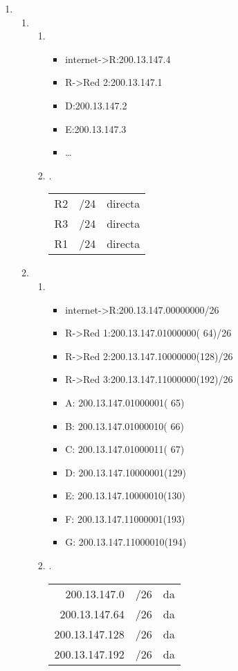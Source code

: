 \documentclass[11pt]{article}
\begin{document}
\begin{enumerate}
\begin{enumerate}
\end{enumerate}
\item \begin{enumerate}
\item \begin{enumerate}
\item \begin{itemize}
\item internet->R:200.13.147.4
\item R->Red 2:200.13.147.1
\item D:200.13.147.2
\item E:200.13.147.3
\item \ldots{}
\end{itemize}
\item .
\begin{center}
\begin{tabular}{lll}
R2 & /24 & directa\\
R3 & /24 & directa\\
R1 & /24 & directa\\
\end{tabular}
\end{center}
\end{enumerate}
\item \begin{enumerate}
\item \begin{itemize}
\item internet->R:200.13.147.00000000/26
\item R->Red 1:200.13.147.01000000( 64)/26
\item R->Red 2:200.13.147.10000000(128)/26
\item R->Red 3:200.13.147.11000000(192)/26
\item A: 200.13.147.01000001( 65)
\item B: 200.13.147.01000010( 66)
\item C: 200.13.147.01000011( 67)
\item D: 200.13.147.10000001(129)
\item E: 200.13.147.10000010(130)
\item F: 200.13.147.11000001(193)
\item G: 200.13.147.11000010(194)
\end{itemize}
\item .
\begin{center}
\begin{tabular}{rll}
200.13.147.0 & /26 & da\\
200.13.147.64 & /26 & da\\
200.13.147.128 & /26 & da\\
200.13.147.192 & /26 & da\\
\end{tabular}
\end{center}
\end{enumerate}
\end{enumerate}
\end{enumerate}
\end{document}
